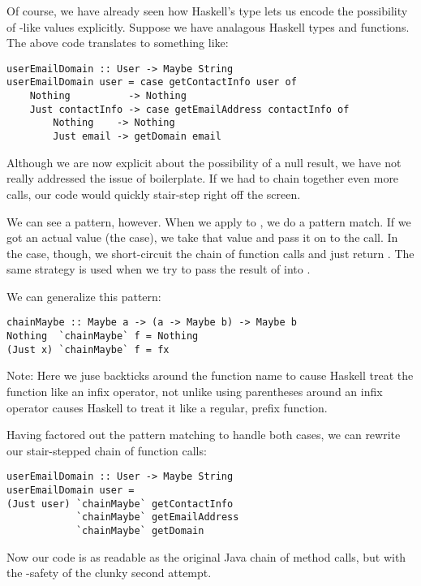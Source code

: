 Of course, we have already seen how Haskell's  type lets us encode the possibility of -like values
explicitly. Suppose we have analagous Haskell types and functions. The above code translates to something like:

\begin{lstlisting}
userEmailDomain :: User -> Maybe String
userEmailDomain user = case getContactInfo user of
    Nothing          -> Nothing
    Just contactInfo -> case getEmailAddress contactInfo of
        Nothing    -> Nothing
        Just email -> getDomain email
\end{lstlisting}

Although we are now explicit about the possibility of a null result, we have not really addressed the issue of boilerplate.
If we had to chain together even more calls, our code would quickly stair-step right off the screen.

We can see a pattern, however. When we apply  to , we do a pattern match. If we got an
actual value (the  case), we take that value and pass it on to the  call. In the 
case, though, we short-circuit the chain of function calls and just return . The same strategy is used when
we try to pass the result of  into .
 
We can generalize this pattern:

\begin{lstlisting}
chainMaybe :: Maybe a -> (a -> Maybe b) -> Maybe b
Nothing  `chainMaybe` f = Nothing
(Just x) `chainMaybe` f = fx
\end{lstlisting}

Note: Here we juse backticks around the function name to cause Haskell treat the function like an infix operator, not unlike
using parentheses around an infix operator causes Haskell to treat it like a regular, prefix function.

Having factored out the pattern matching to handle both cases, we can rewrite our stair-stepped chain of function calls:

\begin{lstlisting}
userEmailDomain :: User -> Maybe String
userEmailDomain user =
(Just user) `chainMaybe` getContactInfo
            `chainMaybe` getEmailAddress
            `chainMaybe` getDomain
\end{lstlisting}

Now our code is as readable as the original Java chain of method calls, but with the -safety of the clunky second attempt.

